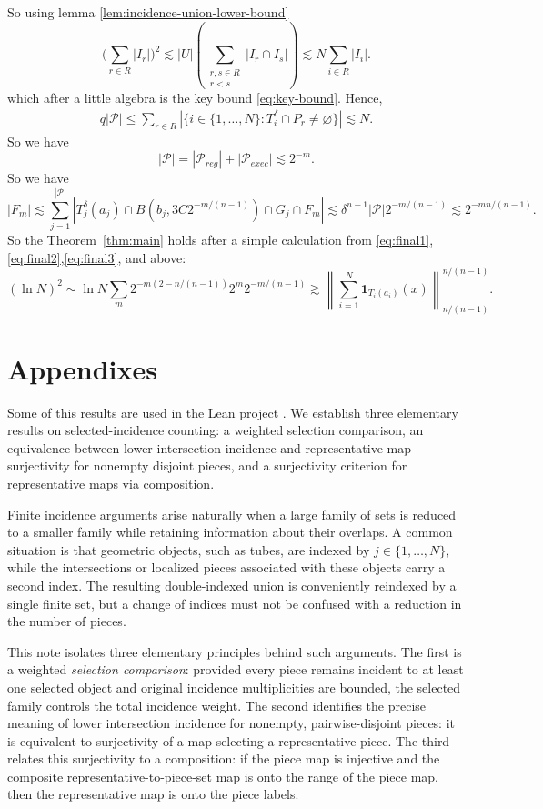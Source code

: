 \documentclass[11pt, letterpaper]{nyjm}
\begin{document}
So using lemma \ref{lem:incidence-union-lower-bound} 
\[ 
\bigl(\sum_{r\in R}|I_r|\bigr)^2 \lesssim |U|(\sum_{\substack{r,s\in R\\r<s}}|I_r\cap I_s|) \lesssim N\sum_{i \in R}|I_i|. 	 
\]
which after a little algebra is the key bound \eqref{eq:key-bound}.  
Hence,
\[
\begin{aligned}
	q|\mathcal P|
	\leq  \sum_{r \in R}|\{i\in\{1,\ldots,N\}: T_i^\delta\cap P_r\ne\varnothing\}| 
	\lesssim N.
\end{aligned}
\]
	So we have 
	\[
	|\mathcal P| = |\mathcal P_{reg}| + |\mathcal P_{exec}| \lesssim 2^{-m}.
	\]
	So we have 
	\begin{equation}
		|F_m| \lesssim \sum_ {j=1}^{|\mathcal P|}|T^\delta_j(a_j) \cap B(b_{j},3C2^{-m/(n-1)}) \cap G_j \cap F_m| \lesssim \delta^{n-1}|\mathcal P|2^{-m/(n-1)} \lesssim 2^{-mn/(n-1)}.
	\end{equation}
	So the Theorem~\ref{thm:main} holds after a simple calculation from \eqref{eq:final1}, \eqref{eq:final2},\eqref{eq:final3}, and above:
	\[
	(\ln N)^2 \sim \ln N\sum_m 2^{-m(2-n/(n-1))} 2^{m}2^{-m/(n-1)}
	\gtrsim \left\| \sum_{i=1}^{N} \mathbf{1}_{T_i(a_i)}(x)
	\right\|_{n/(n-1)}^{n/(n-1)}.
	\] 
	
	\section{Appendixes}
	\appendix
	Some of this results are used in the Lean project \cite{Aspegren2026Lean}.
	We establish three elementary results on selected-incidence counting: a weighted selection comparison, an equivalence between lower intersection incidence and representative-map surjectivity for nonempty disjoint pieces, and a surjectivity criterion for representative maps via composition. 
	
	Finite incidence arguments arise naturally when a large family of sets is
	reduced to a smaller family while retaining information about their
	overlaps. A common situation is that geometric objects, such as tubes,
	are indexed by $j\in\{1,\ldots,N\}$, while the intersections or localized
	pieces associated with these objects carry a second index.  The resulting
	double-indexed union is conveniently reindexed by a single finite set,
	but a change of indices must not be confused with a reduction in the
	number of pieces.
	
	This note isolates three elementary principles behind such arguments.
	The first is a weighted \emph{selection comparison}: provided every
	piece remains incident to at least one selected object and original
	incidence multiplicities are bounded, the selected family controls the
	total incidence weight. The second identifies the precise meaning of
	lower intersection incidence for nonempty, pairwise-disjoint pieces:
	it is equivalent to surjectivity of a map selecting a representative
	piece. The third relates this surjectivity to a composition: if the
	piece map is injective and the composite representative-to-piece-set
	map is onto the range of the piece map, then the representative map is
	onto the piece labels.
	
\end{document}
